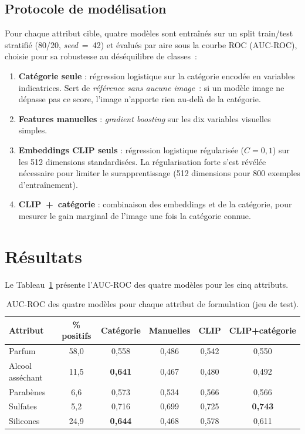 \documentclass[11pt,a4paper]{article}
\begin{document}
\subsection{Protocole de modélisation}

Pour chaque attribut cible, quatre modèles sont entraînés sur un split train/test stratifié (80/20, \emph{seed}~=~42) et évalués par aire sous la courbe ROC (AUC-ROC), choisie pour sa robustesse au déséquilibre de classes~:

\begin{enumerate}[leftmargin=1.5em]
  \item \textbf{Catégorie seule} : régression logistique sur la catégorie encodée en variables indicatrices. Sert de \emph{référence sans aucune image}~: si un modèle image ne dépasse pas ce score, l'image n'apporte rien au-delà de la catégorie.
  \item \textbf{Features manuelles} : \emph{gradient boosting} sur les dix variables visuelles simples.
  \item \textbf{Embeddings CLIP seuls} : régression logistique régularisée ($C=0{,}1$) sur les 512 dimensions standardisées. La régularisation forte s'est révélée nécessaire pour limiter le surapprentissage (512 dimensions pour 800 exemples d'entraînement).
  \item \textbf{CLIP~+~catégorie} : combinaison des embeddings et de la catégorie, pour mesurer le gain marginal de l'image une fois la catégorie connue.
\end{enumerate}

\section{Résultats}

Le Tableau~\ref{tab:results} présente l'AUC-ROC des quatre modèles pour les cinq attributs.

\begin{table}[h]
\centering
\small
\begin{tabular}{lccccc}
\toprule
\textbf{Attribut} & \textbf{\% positifs} & \textbf{Catégorie} & \textbf{Manuelles} & \textbf{CLIP} & \textbf{CLIP+catégorie} \\
\midrule
Parfum & 58{,}0 & 0{,}558 & 0{,}486 & 0{,}542 & 0{,}550 \\
Alcool asséchant & 11{,}5 & \textbf{0{,}641} & 0{,}467 & 0{,}480 & 0{,}492 \\
Parabènes & 6{,}6 & 0{,}573 & 0{,}534 & 0{,}566 & 0{,}566 \\
Sulfates & 5{,}2 & 0{,}716 & 0{,}699 & 0{,}725 & \textbf{0{,}743} \\
Silicones & 24{,}9 & \textbf{0{,}644} & 0{,}468 & 0{,}578 & 0{,}611 \\
\bottomrule
\end{tabular}
\caption{AUC-ROC des quatre modèles pour chaque attribut de formulation (jeu de test).}
\label{tab:results}
\end{table}
\end{document}
